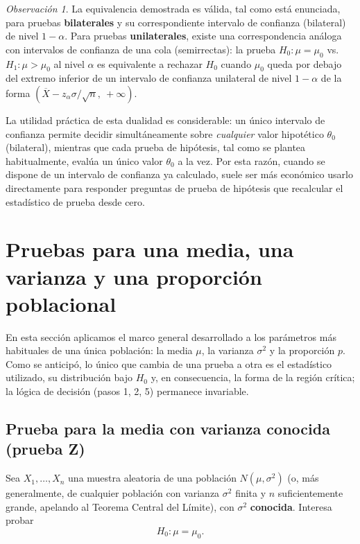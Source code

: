 \documentclass[11pt,a4paper]{article}
\theoremstyle{plain}
\theoremstyle{definition}
\theoremstyle{remark}
\newtheorem{observacion}[teorema]{Observación}
\begin{document}
\begin{observacion}
La equivalencia demostrada es válida, tal como está enunciada, para pruebas \textbf{bilaterales} y su correspondiente intervalo de confianza (bilateral) de nivel $1-\alpha$. Para pruebas \textbf{unilaterales}, existe una correspondencia análoga con intervalos de confianza de una cola (semirrectas): la prueba $H_0:\mu=\mu_0$ vs. $H_1:\mu>\mu_0$ al nivel $\alpha$ es equivalente a rechazar $H_0$ cuando $\mu_0$ queda por debajo del extremo inferior de un intervalo de confianza unilateral de nivel $1-\alpha$ de la forma $\left(\overline X - z_\alpha \sigma/\sqrt n,\ +\infty\right)$.

La utilidad práctica de esta dualidad es considerable: un único intervalo de confianza permite decidir simultáneamente sobre \emph{cualquier} valor hipotético $\theta_0$ (bilateral), mientras que cada prueba de hipótesis, tal como se plantea habitualmente, evalúa un único valor $\theta_0$ a la vez. Por esta razón, cuando se dispone de un intervalo de confianza ya calculado, suele ser más económico usarlo directamente para responder preguntas de prueba de hipótesis que recalcular el estadístico de prueba desde cero.
\end{observacion}

\newpage
\section{Pruebas para una media, una varianza y una proporción poblacional}

En esta sección aplicamos el marco general desarrollado a los parámetros más habituales de una única población: la media $\mu$, la varianza $\sigma^2$ y la proporción $p$. Como se anticipó, lo único que cambia de una prueba a otra es el estadístico utilizado, su distribución bajo $H_0$ y, en consecuencia, la forma de la región crítica; la lógica de decisión (pasos 1, 2, 5) permanece invariable.

\subsection{Prueba para la media con varianza conocida (prueba Z)}

Sea $X_1,\dots,X_n$ una muestra aleatoria de una población $N(\mu,\sigma^2)$ (o, más generalmente, de cualquier población con varianza $\sigma^2$ finita y $n$ suficientemente grande, apelando al Teorema Central del Límite), con $\sigma^2$ \textbf{conocida}. Interesa probar
\[
H_0:\mu=\mu_0.
\]
\end{document}

